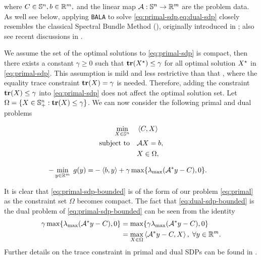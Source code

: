 \documentclass[11pt]{article}
\newcommand{\alg}{\texttt{BALA}}%
\begin{document}
\noindent where  $C \in \mathbb{S}^n, b \in \mathbb{R}^m,$ and the linear map $\mathcal{A}: \mathbb{S}^n \to \mathbb{R}^m $ are the problem data. As well see below, applying \alg{} to solve \cref{eq:primal-sdp,eq:dual-sdp} closely resembles the classical {Spectral Bundle Method (\SBM)}, originally introduced in \cite{helmberg2000spectral}; also see recent discussions in \cite{ding2023revisiting,liao2023overview}. 


We assume the set of the optimal solutions to \cref{eq:primal-sdp} is compact, then there exists a constant $\gamma \geq 0$ such that $\mathop{\bf tr}(X^\star) \leq \gamma$ for all optimal solution $X^\star$ in \cref{eq:primal-sdp}. This assumption is mild and less restrictive than that \cite{helmberg2000spectral}, where the equality trace constraint $\mathop{\bf tr}(X) = \gamma$ is needed.  
Therefore, adding the constraint $\mathop{\bf tr}(X) \leq \gamma$ into \cref{eq:primal-sdp} does not affect the optimal solution set. Let $\Omega = \{X\in \mathbb{S}^n_+ : \mathop{\bf tr}(X) \leq \gamma\}$. 
%
We can now consider the following primal and dual problems

\begin{minipage}{0.34\textwidth}
\begin{equation}
    \label{eq:primal-sdp-bounded}
    \begin{aligned}
        \min_{X \in \mathbb{S}^n } & \quad \left \langle C, X \right\rangle \\\mathrm{subject~to} & \quad \mathcal{A} X = b, \\
        & \quad X \in \Omega,
    \end{aligned}
\end{equation}
\end{minipage}
\begin{minipage}{0.61\textwidth}
\begin{equation}
    \label{eq:dual-sdp-bounded}
    \begin{aligned}
        -\min_{y \in \mathbb{R}^m} \; g(y) = & 
        -\left \langle b, y \right\rangle + \gamma \max\{\lambda_{\max}(\mathcal{A}^* y - C),0\}.
    \end{aligned}
\end{equation}
\end{minipage}

It is clear that \cref{eq:primal-sdp-bounded} is of the form of our problem \cref{eq:primal} as the constraint set $\Omega$ becomes compact. 
The fact that \cref{eq:dual-sdp-bounded} is the dual problem of \cref{eq:primal-sdp-bounded} can be seen from the identity 
\begin{equation*}
\begin{aligned}
    \gamma \max\{\lambda_{\max}(\mathcal{A}^* y - C),0\} &=   \max\{ \gamma \lambda_{\max}(\mathcal{A}^* y - C),0\}  \\
    &= \max_{X \in \Omega} \left \langle \mathcal{A}^* y - C, X \right\rangle,\; \forall y \in \mathbb{R}^m.
\end{aligned}
\end{equation*}
Further details on the trace constraint in primal and dual SDPs can be found in \cite{liao2023overview}. 
\end{document}
